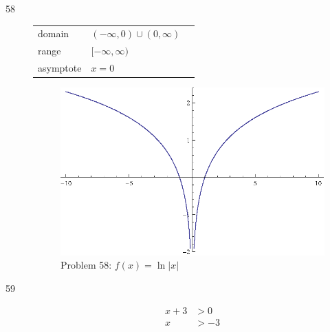 \documentclass{exam}
\begin{document}
\begin{description}


    \item[58]
      \begin{tabular}[H]{lll}
        \toprule
        domain    & $(-\infty, 0) \cup (0, \infty)$ \\
        range     & $[-\infty, \infty)$ \\
        asymptote & $x = 0$ \\
        \bottomrule
      \end{tabular}

      \begin{figure}[H]
        \centering
        \includegraphics[scale = 0.9]{problem58.eps}
        \caption{Problem 58: $f(x) = \ln |x|$}
      \end{figure}

    \item[59]
      \begin{align*}
        x + 3 & > 0 \\
        x     & > -3 \\
      \end{align*}


\end{description}
\end{document}
